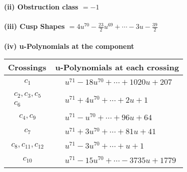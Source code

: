 \documentclass[1p]{elsarticle_modified}
\theoremstyle{definition}
\begin{document}
\flushleft \textbf{(ii) Obstruction class $= -1$}\\~\\
\flushleft \textbf{(iii) Cusp Shapes $= 4 u^{70}-\frac{23}{2} u^{69}+\cdots-3 u-\frac{39}{2}$}\\~\\
\newpage\renewcommand{\arraystretch}{1}
\flushleft \textbf{(iv) u-Polynomials at the component}\newline \\
\begin{tabular}{m{50pt}|m{274pt}}
Crossings & \hspace{64pt}u-Polynomials at each crossing \\
\hline $$\begin{aligned}c_{1}\end{aligned}$$&$\begin{aligned}
&u^{71}-18 u^{70}+\cdots+1020 u+207
\end{aligned}$\\
\hline $$\begin{aligned}c_{2},c_{3},c_{5}\\c_{6}\end{aligned}$$&$\begin{aligned}
&u^{71}+4 u^{70}+\cdots+2 u+1
\end{aligned}$\\
\hline $$\begin{aligned}c_{4},c_{9}\end{aligned}$$&$\begin{aligned}
&u^{71}- u^{70}+\cdots+96 u+64
\end{aligned}$\\
\hline $$\begin{aligned}c_{7}\end{aligned}$$&$\begin{aligned}
&u^{71}+3 u^{70}+\cdots+81 u+41
\end{aligned}$\\
\hline $$\begin{aligned}c_{8},c_{11},c_{12}\end{aligned}$$&$\begin{aligned}
&u^{71}-3 u^{70}+\cdots+u+1
\end{aligned}$\\
\hline $$\begin{aligned}c_{10}\end{aligned}$$&$\begin{aligned}
&u^{71}-15 u^{70}+\cdots-3735 u+1779
\end{aligned}$\\
\hline
\end{tabular}\\~\\
\end{document}
